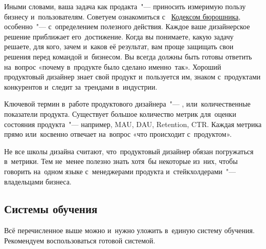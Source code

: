Иными словами, ваша задача как продакта~"--- приносить измеримую
пользу бизнесу и~пользователям. Советуем ознакомиться с~%
\href{https://bureau.ru/soviet/20140623/}{Кодексом бюрошника},
особенно~"--- с~определением полезного действия. Каждое ваше
дизайнерское решение приближает его~достижение. Когда вы понимаете,
какую задачу решаете, для кого, зачем и~каков её результат, вам
проще защищать свои решения перед командой и~бизнесом. Вы всегда
должны быть готовы ответить на~вопрос «почему в~продукте было
сделано именно~так». Хороший продуктовый дизайнер знает свой продукт
и~пользуется им, знаком с~продуктами конкурентов и~следит
за~трендами в~индустрии.


Ключевой термин в~работе продуктового дизайнера~"--- ,
или~количественные показатели продукта. Существует большое
количество метрик для~оценки состояния продукта~"--- например, MAU,
DAU, Retention, CTR. Каждая метрика прямо или~косвенно отвечает
на~вопрос «что происходит с~продуктом».

Не все школы дизайна считают, что~продуктовый дизайнер обязан
погружаться в~метрики. Тем не~менее полезно знать хотя~бы некоторые
из~них, чтобы говорить на~одном языке с~менеджерами продукта
и~стейкхолдерами~"--- владельцами бизнеса. 

\subsection{Системы обучения}

Всё перечисленное выше можно и~нужно уложить в~единую систему
обучения. Рекомендуем воспользоваться готовой системой.

